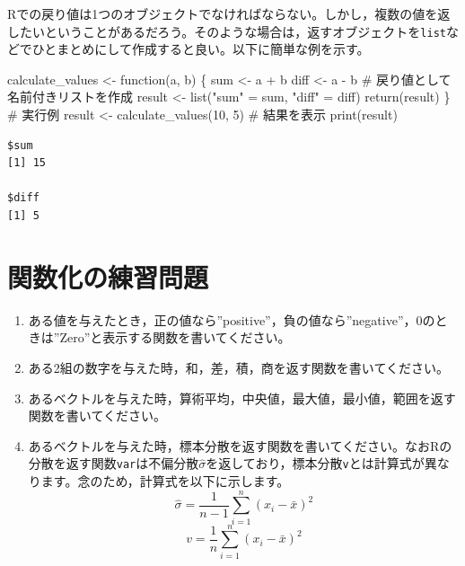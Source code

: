 \documentclass[
  a4paper,
]{ltjsbook}
\newenvironment{Shaded}{\begin{snugshade}}{\end{snugshade}}
\newcommand{\CommentTok}[1]{\textcolor[rgb]{0.37,0.37,0.37}{#1}}
\newcommand{\ControlFlowTok}[1]{\textcolor[rgb]{0.00,0.23,0.31}{#1}}
\newcommand{\DecValTok}[1]{\textcolor[rgb]{0.68,0.00,0.00}{#1}}
\newcommand{\FunctionTok}[1]{\textcolor[rgb]{0.28,0.35,0.67}{#1}}
\newcommand{\NormalTok}[1]{\textcolor[rgb]{0.00,0.23,0.31}{#1}}
\newcommand{\OtherTok}[1]{\textcolor[rgb]{0.00,0.23,0.31}{#1}}
\newcommand{\SpecialCharTok}[1]{\textcolor[rgb]{0.37,0.37,0.37}{#1}}
\newcommand{\StringTok}[1]{\textcolor[rgb]{0.13,0.47,0.30}{#1}}
\providecommand{\tightlist}{%
  \setlength{\itemsep}{0pt}\setlength{\parskip}{0pt}}\usepackage{longtable,booktabs,array}
\begin{document}
Rでの戻り値は1つのオブジェクトでなければならない。しかし，複数の値を返したいということがあるだろう。そのような場合は，返すオブジェクトを\texttt{list}などでひとまとめにして作成すると良い。以下に簡単な例を示す。

\begin{Shaded}
\begin{Highlighting}[]
\NormalTok{calculate\_values }\OtherTok{\textless{}{-}} \ControlFlowTok{function}\NormalTok{(a, b) \{}
\NormalTok{  sum }\OtherTok{\textless{}{-}}\NormalTok{ a }\SpecialCharTok{+}\NormalTok{ b}
\NormalTok{  diff }\OtherTok{\textless{}{-}}\NormalTok{ a }\SpecialCharTok{{-}}\NormalTok{ b}
  \CommentTok{\# 戻り値として名前付きリストを作成}
\NormalTok{  result }\OtherTok{\textless{}{-}} \FunctionTok{list}\NormalTok{(}\StringTok{"sum"} \OtherTok{=}\NormalTok{ sum, }\StringTok{"diff"} \OtherTok{=}\NormalTok{ diff)}
  \FunctionTok{return}\NormalTok{(result)}
\NormalTok{\}}
\CommentTok{\# 実行例}
\NormalTok{result }\OtherTok{\textless{}{-}} \FunctionTok{calculate\_values}\NormalTok{(}\DecValTok{10}\NormalTok{, }\DecValTok{5}\NormalTok{)}
\CommentTok{\# 結果を表示}
\FunctionTok{print}\NormalTok{(result)}
\end{Highlighting}
\end{Shaded}

\begin{verbatim}
$sum
[1] 15

$diff
[1] 5
\end{verbatim}

\section{関数化の練習問題}\label{ux95a2ux6570ux5316ux306eux7df4ux7fd2ux554fux984c}

\begin{enumerate}
\def\labelenumi{\arabic{enumi}.}
\tightlist
\item
  ある値を与えたとき，正の値なら''positive''，負の値なら''negative''，0のときは''Zero''と表示する関数を書いてください。
\item
  ある2組の数字を与えた時，和，差，積，商を返す関数を書いてください。
\item
  あるベクトルを与えた時，算術平均，中央値，最大値，最小値，範囲を返す関数を書いてください。
\item
  あるベクトルを与えた時，標本分散を返す関数を書いてください。なおRの分散を返す関数\texttt{var}は不偏分散\(\hat{\sigma}\)を返しており，標本分散\texttt{v}とは計算式が異なります。念のため，計算式を以下に示します。
  \[\hat{\sigma} = \frac{1}{n-1}\sum_{i=1}^n (x_i - \bar{x})^2 \]
  \[v= \frac{1}{n}\sum_{i=1}^n (x_i - \bar{x})^2 \]
\end{enumerate}
\end{document}
